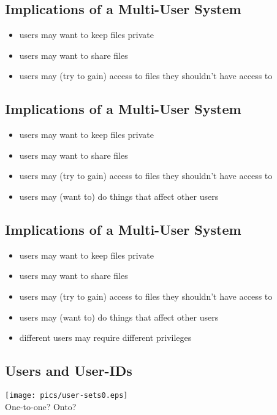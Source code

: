 \documentclass[xga]{xdvislides}
\begin{document}
\subsection{Implications of a Multi-User System}
\begin{itemize}
	\item users may want to keep files private
	\item users may want to share files
	\item users may (try to gain) access to files they shouldn't have access to
\end{itemize}

\subsection{Implications of a Multi-User System}
\begin{itemize}
	\item users may want to keep files private
	\item users may want to share files
	\item users may (try to gain) access to files they shouldn't have access to
	\item users may (want to) do things that affect other users
\end{itemize}

\subsection{Implications of a Multi-User System}
\begin{itemize}
	\item users may want to keep files private
	\item users may want to share files
	\item users may (try to gain) access to files they shouldn't have access to
	\item users may (want to) do things that affect other users
	\item different users may require different privileges
\end{itemize}

\subsection{Users and User-IDs}
\begin{center}
	\texttt{[image: pics/user-sets0.eps]} \\
	One-to-one?  Onto?
\end{center}
\end{document}
